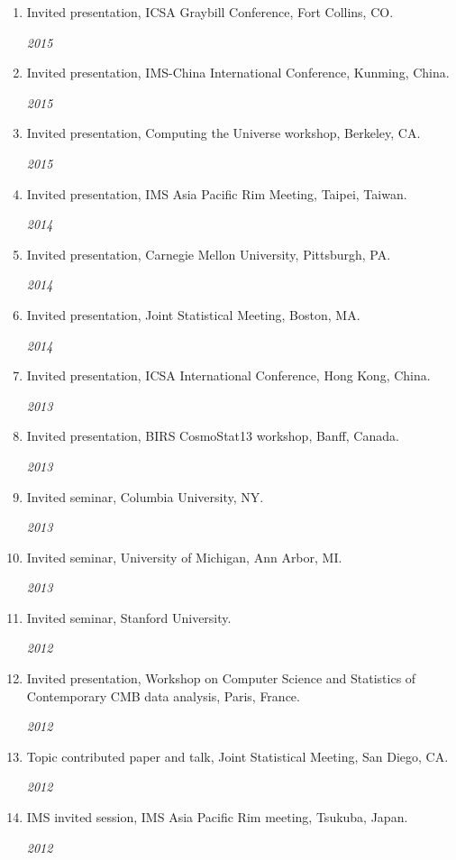 \documentclass[11pt]{article}
\newcommand{\ddatedentry}[2]{
  {#1}
  \hfill
  \begin{minipage}{.5in}{\hfill\textit{#2}}\end{minipage}
  }
\begin{document}
\begin{enumerate}


\item
\ddatedentry{Invited presentation, ICSA Graybill Conference, Fort Collins, CO.}{2015}


\item
\ddatedentry{Invited presentation, IMS-China International Conference, Kunming, China.}{2015}

\item
\ddatedentry{Invited presentation, Computing the Universe workshop, Berkeley, CA.}{2015}

\item
\ddatedentry{Invited presentation, IMS Asia Pacific Rim Meeting, Taipei, Taiwan.}{2014}


\item
\ddatedentry{Invited presentation,  Carnegie Mellon University, Pittsburgh, PA.}{2014}


\item
\ddatedentry{Invited presentation,  Joint Statistical Meeting, Boston, MA.}{2014}


\item
\ddatedentry{Invited presentation, ICSA International Conference, Hong Kong, China.}{2013}

\item
\ddatedentry{Invited presentation, BIRS CosmoStat13 workshop, Banff, Canada.}{2013}

\item
\ddatedentry{Invited seminar, Columbia University,  NY.}{2013}


\item
\ddatedentry{Invited seminar, University of Michigan, Ann Arbor, MI.}{2013}


\item
\ddatedentry{Invited seminar, Stanford University.}{2012}


\item
\ddatedentry{Invited presentation, Workshop on Computer Science and
Statistics of \\Contemporary CMB data analysis, Paris, France.}{2012}

\item
\ddatedentry{Topic contributed paper and talk, Joint Statistical Meeting, San Diego, CA.}{2012}

\item
\ddatedentry{IMS invited session, IMS Asia Pacific Rim meeting, Tsukuba, Japan.}{2012}



\end{enumerate}
\end{document}
